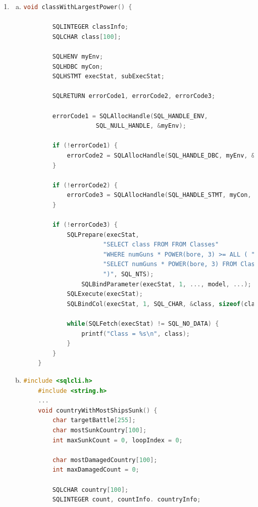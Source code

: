 \documentclass[12pt]{article}
\begin{document}
\begin{enumerate}[1.]
\begin{enumerate}[a)]
    \end{enumerate}

    \item

    \begin{enumerate}[a)]
        \item

    \begin{lstlisting}[language=c]
    void classWithLargestPower() {

        SQLINTEGER classInfo;
        SQLCHAR class[100];

        SQLHENV myEnv;
        SQLHDBC myCon;
        SQLHSTMT execStat, subExecStat;

        SQLRETURN errorCode1, errorCode2, errorCode3;

        errorCode1 = SQLAllocHandle(SQL_HANDLE_ENV,
                    SQL_NULL_HANDLE, &myEnv);

        if (!errorCode1) {
            errorCode2 = SQLAllocHandle(SQL_HANDLE_DBC, myEnv, &myCon);
        }

        if (!errorCode2) {
            errorCode3 = SQLAllocHandle(SQL_HANDLE_STMT, myCon, &execStat);
        }

        if (!errorCode3) {
            SQLPrepare(execStat,
                      "SELECT class FROM FROM Classes"
                      "WHERE numGuns * POWER(bore, 3) >= ALL ( "
                      "SELECT numGuns * POWER(bore, 3) FROM Classes "
                      ")", SQL_NTS);
                SQLBindParameter(execStat, 1, ..., model, ...);
            SQLExecute(execStat);
            SQLBindCol(execStat, 1, SQL_CHAR, &class, sizeof(class), &classInfo);

            while(SQLFetch(execStat) != SQL_NO_DATA) {
                printf("Class = %s\n", class);
            }
        }
    }
    \end{lstlisting}

        \item

    \begin{lstlisting}[language=c]
    #include <sqlcli.h>
    #include <string.h>
    ...
    void countryWithMostShipsSunk() {
        char targetBattle[255];
        char mostSunkCountry[100];
        int maxSunkCount = 0, loopIndex = 0;

        char mostDamagedCountry[100];
        int maxDamagedCount = 0;

        SQLCHAR country[100];
        SQLINTEGER count, countInfo. countryInfo;


\end{lstlisting}
\end{enumerate}
\end{enumerate}
\end{document}
